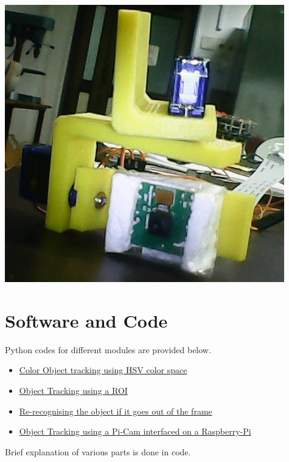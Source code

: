 \documentclass[a4paper,12pt,oneside]{book}
\begin{document}
		  \begin{center}
		   \includegraphics[scale=0.6]{frame.jpg}
		\end{center}



\section{Software and Code}
Python codes for different modules are provided below.
\begin{itemize}
    \item \href{https://github.com/eYSIP-2016/Object-Tracking-Camera/blob/master/Tutorials/1.%20Colored%20object%20tracking%20using%20HSV/Colored_object_tracking_using_HSV.py}{Color Object tracking using HSV color space}
    \item \href{https://github.com/eYSIP-2016/Object-Tracking-Camera/blob/master/Tutorials/2.%20Object%20tracking%28Based%20on%20ROI%29/Colored_Object_tracking_based_on_ROI_selection.py}{Object Tracking using a ROI}
    \item \href{https://github.com/eYSIP-2016/Object-Tracking-Camera/blob/master/Tutorials/4.%20Re-recognizing%20the%20object%20if%20it%20escapes%20and%20comes%20back%20into%20the%20frame.%20Tutorial%20on%20algorithm%20used/code.py}{Re-recognising the object if it goes out of the frame}
    \item \href{https://github.com/eYSIP-2016/Object-Tracking-Camera/blob/master/Tutorials/6.%20Object%20%20Tracking%20using%20a%20Pi-Cam%20interfaced%20on%20a%20Raspberry-Pi/code.py}{Object Tracking using a Pi-Cam interfaced on a Raspberry-Pi}
\end{itemize}
Brief explanation of various parts is done in code.
\end{document}
